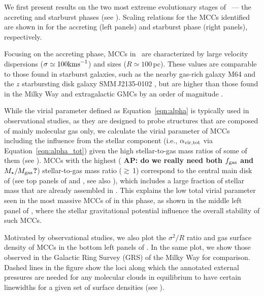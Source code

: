 \IfFileExists{emulateapjlegacy.cls}{\documentclass[iop]{emulateapjlegacy}}{\documentclass[iop]{emulateapj}}
\newcommand{\AP}[1]{({\bf \color{apcolor} AP: #1})}
\begin{document}
We first present results on the two most extreme evolutionary stages of \flower\ --- the accreting and starburst phases (see ).
Scaling relations for the MCCs identified are shown in  for the accreting (left panels) and starburst phase (right panels), respectively.

Focusing on the accreting phase, MCCs in \flower\ are characterized by large velocity dispersions ($\sigma \simeq 100 {\rm km s}^{-1}$)
and sizes ($R\simeq 100$\,pc). These values are comparable to those found in starburst galaxies,
such as the nearby gas-rich galaxy M64 and
the $z$ starbursting disk galaxy SMM\,J2135-0102 %
\citep{Rosolowsky05a, Swinbank11a}, but are higher than those found in the Milky Way and extragalactic GMCs by an order of magnitude \citep{Heyer04a, Bolatto08a}.

While the virial parameter defined as Equation~\ref{eqn:alpha} is typically used in observational studies, as they are designed to probe structures that are
composed of mainly molecular gas only, we calculate the virial parameter of MCCs including the influence from the stellar component
(i.e., $\alpha_{\rm vir, tot}$ via Equation~\ref{eqn:alpha_tot}) given the high stellar-to-gas mass ratios of
some of them (see ).
MCCs with the highest \AP{do we really need both $f_{\rm gas}$ and $M_\star/M_{\rm gas}$?} stellar-to-gas mass ratio ($\gtrsim$\,1) correspond to the central main disk of \flower (see top panels of
 and , see also ), which includes a large fraction of stellar mass that are already assembled in \flower.
This explains the low total virial parameter seen in the most massive MCCs of \flower in this phase, as shown in
the middle left panel of , where the stellar gravitational potential influence the overall stability of such MCCs.

Motivated by observational studies, we also plot the $\sigma^2/R$ ratio and gas surface density of MCCs in the bottom left panels of .
In the same plot, we show those observed in the Galactic Ring Survey (GRS) of the Milky Way \citep{Heyer09a} for comparison.
Dashed lines in the figure show the loci along which the annotated external pressures are needed for any molecular clouds in equilibrium
to have certain linewidths for a given set of surface densities (see ).
\end{document}
